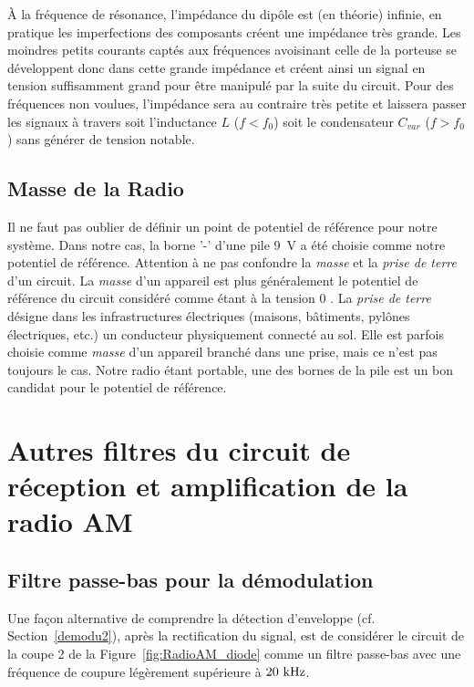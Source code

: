 
À la fréquence de résonance, l'impédance du dipôle est (en théorie) infinie,
en pratique les imperfections des composants créent une impédance très grande.
Les moindres petits courants captés aux fréquences avoisinant celle de la 
porteuse se développent donc dans cette grande impédance et créent ainsi un signal 
en tension suffisamment grand pour être manipulé par la suite du circuit.  
Pour des fréquences non voulues, l'impédance sera au contraire très petite et 
laissera passer les signaux à travers soit l'inductance $L$ ($f<f_0$) soit 
le condensateur $C_{var}$ ($f>f_0$) sans générer de tension notable.  

\subsection{Masse de la Radio}
Il ne faut pas oublier de définir un point de potentiel de référence pour notre 
système. Dans notre cas, la borne '-' d'une pile 9~V a été choisie comme notre potentiel 
de référence. Attention à ne pas confondre la \textit{masse} et la \textit{prise de terre} 
d'un circuit. La \textit{masse} d'un appareil est plus généralement le potentiel
de référence du circuit considéré comme étant à la tension 0 \volt. La 
\textit{prise de terre} désigne dans les infrastructures électriques 
(maisons, bâtiments, pylônes électriques, etc.) un conducteur physiquement 
connecté au sol. Elle est parfois choisie comme \textit{masse} d'un appareil 
branché dans une prise, mais ce n'est pas toujours le cas.
Notre radio étant portable, une des bornes de la pile est un bon candidat pour 
le potentiel de référence. 


\section{Autres filtres du circuit de réception et amplification de la radio AM}
\subsection{Filtre passe-bas pour la démodulation}
Une façon alternative de comprendre la détection d'enveloppe 
(cf. Section~\ref{demodu2}), après la rectification du signal, 
est de considérer le circuit de la coupe 2 de la Figure~\ref{fig:RadioAM_diode} 
comme un filtre passe-bas avec une fréquence de coupure légèrement supérieure 
à $20 \text{~kHz}$. 

